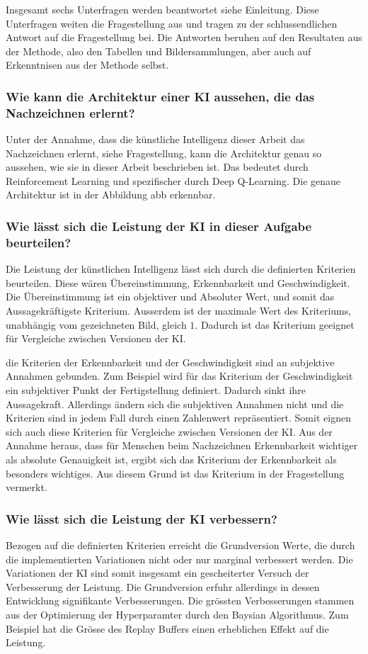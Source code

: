 Insgesamt sechs Unterfragen werden beantwortet {siehe Einleitung}. Diese
Unterfragen weiten die Fragestellung aus und tragen zu der schlussendlichen
Antwort auf die Fragestellung bei. Die Antworten beruhen auf den Resultaten aus
der Methode, also den Tabellen und Bildersammlungen, aber auch auf Erkenntnisen
aus der Methode selbst.

\subsubsection*{Wie kann die Architektur einer KI aussehen, die das Nachzeichnen erlernt?}
\label{subsub:d_frage_unter_1}
Unter der Annahme, dass die künstliche Intelligenz dieser Arbeit das
Nachzeichnen erlernt, {siehe Fragestellung}, kann die Architektur genau so
aussehen, wie sie in dieser Arbeit beschrieben ist. Das bedeutet durch
Reinforcement Learning und spezifischer durch Deep Q-Learning. Die genaue
Architektur ist in der Abbildung {abb} erkennbar.

\subsubsection*{Wie lässt sich die Leistung der KI in dieser Aufgabe beurteilen?}
\label{subsub:d_frage_unter_2}
Die Leistung der künstlichen Intelligenz lässt sich durch die definierten
Kriterien beurteilen. Diese wären Übereinstimmung, Erkennbarkeit und
Geschwindigkeit. Die Übereinstimmung ist ein objektiver und Absoluter Wert, und
somit das Aussagekräftigste Kriterium. Ausserdem ist der maximale Wert des
Kriteriums, unabhängig vom gezeichneten Bild, gleich $1$. Dadurch ist das
Kriterium geeignet für Vergleiche zwischen Versionen der KI.

die Kriterien der Erkennbarkeit und der Geschwindigkeit sind an subjektive
Annahmen gebunden. Zum Beispiel wird für das Kriterium der Geschwindigkeit ein
subjektiver Punkt der Fertigstellung definiert. Dadurch sinkt ihre Aussagekraft.
Allerdings ändern sich die subjektiven Annahmen nicht und die Kriterien sind in
jedem Fall durch einen Zahlenwert repräsentiert. Somit eignen sich auch diese
Kriterien für Vergleiche zwischen Versionen der KI. Aus der Annahme heraus, dass
für Menschen beim Nachzeichnen Erkennbarkeit wichtiger als absolute Genauigkeit
ist, ergibt sich das Kriterium der Erkennbarkeit als besonders wichtiges. Aus
diesem Grund ist das Kriterium in der Fragestellung vermerkt.



\subsubsection*{Wie lässt sich die Leistung der KI verbessern?}
\label{subsub:d_frage_unter_3}
Bezogen auf die definierten Kriterien erreicht die Grundversion Werte, die durch
die implementierten Variationen nicht oder nur marginal verbessert werden. Die
Variationen der KI sind somit insgesamt ein gescheiterter Versuch der
Verbesserung der Leistung. Die Grundversion erfuhr allerdings in dessen
Entwicklung signifikante Verbesserungen. Die grössten Verbesserungen stammen aus
der Optimierung der Hyperparamter durch den Baysian Algorithmus. Zum Beispiel
hat die Grösse des Replay Buffers einen erheblichen Effekt auf die Leistung.

